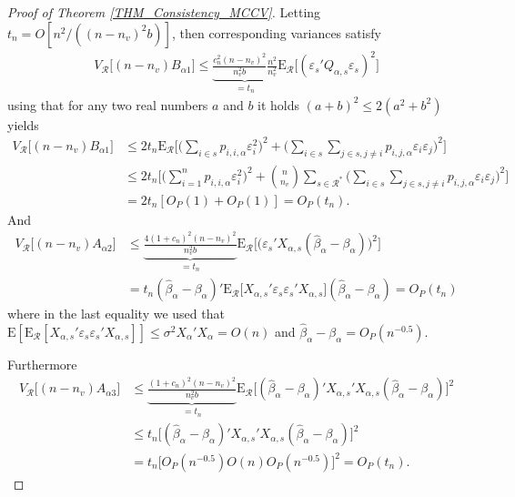 \documentclass[Research_Module_ES.tex]{subfiles}
\begin{document}
\begin{proof}[Proof of Theorem \ref{THM_Consistency_MCCV}]
	Letting $t_n=O[n^2/((n-n_v)^2b)]$, then corresponding variances satisfy
	\begin{align*}
	V_\mathcal{R}\bigl[(n-n_v)B_{\alpha1}\bigr]\le \underbrace{\frac{c_n^2(n-n_v)^2}{n_v^2b}\frac{n^2}{n_v^2}}_{=t_n} \mathrm{E}_\mathcal{R}\biggl[ (\varepsilon_s'Q_{\alpha,s}\varepsilon_s)^2\biggr]
	\end{align*}
	using that for any two real numbers $a$ and $b$ it holds $(a+b)^2\le 2(a^2+b^2)$ yields
	\begin{align*}
	V_\mathcal{R}\bigl[(n-n_v)B_{\alpha1}\bigr]
	&\le 2t_n\mathrm{E}_\mathcal{R}\biggl[\biggl(\sum_{i\in s} p_{i,i,\alpha}\varepsilon_i^2\biggr)^2 + \biggl(\sum_{i\in s}\sum_{j\in s,j\neq i} p_{i,j,\alpha}\varepsilon_i\varepsilon_j\biggr)^2\biggr]\\
	&\le 2t_n \biggl[\biggl(\sum_{i=1}^n p_{i,i,\alpha}\varepsilon_i^2\biggr)^2 + \binom{n}{n_v}\sum_{s\in \mathcal{R}^\ast}\biggl(\sum_{i\in s}\sum_{j\in s,j\neq i} p_{i,j,\alpha}\varepsilon_i\varepsilon_j\biggr)^2\biggr]\\
	&= 2t_n [O_P(1)+O_P(1)]=O_P(t_n).
	\end{align*}
	And 
	\begin{align*}
	V_\mathcal{R}\bigl[(n-n_v)A_{\alpha2}\bigr]
	&\le \underbrace{\frac{4(1+c_n)^2(n-n_v)^2}{n_v^2b}}_{=t_n}\mathrm{E}_\mathcal{R}\bigl[ \bigl(\varepsilon_s'X_{\alpha,s}(\hat{\beta}_\alpha-\beta_\alpha)\bigr)^2\bigr]\\
	&= t_n (\hat{\beta}_\alpha-\beta_\alpha)'\mathrm{E}_\mathcal{R}\bigl[X_{\alpha,s}'\varepsilon_s \varepsilon_s'X_{\alpha,s}\bigr](\hat{\beta}_\alpha-\beta_\alpha) = O_P(t_n)
	\end{align*}
	where in the last equality we used that $\mathrm{E}[\mathrm{E}_\mathcal{R}[X_{\alpha,s}'\varepsilon_s \varepsilon_s'X_{\alpha,s}]]\le \sigma^2 X_\alpha'X_\alpha=O(n)$ and $\hat{\beta}_\alpha-\beta_\alpha=O_P(n^{-0.5})$.\
	
	Furthermore
	\begin{align*}
	V_\mathcal{R}\bigl[(n-n_v)A_{\alpha3}\bigr]
	&\le \underbrace{\frac{(1+c_n)^2(n-n_v)^2}{n_v^2b}}_{=t_n}\mathrm{E}_\mathcal{R}\bigl[(\hat{\beta}_\alpha-\beta_\alpha)'X_{\alpha,s}'X_{\alpha,s}(\hat{\beta}_\alpha-\beta_\alpha)\bigr]^2\\
	&\le t_n \bigl[(\hat{\beta}_\alpha-\beta_\alpha)'X_{\alpha,s}'X_{\alpha,s}(\hat{\beta}_\alpha-\beta_\alpha)\bigr]^2\\
	&= t_n \bigl[O_P(n^{-0.5})O(n)O_P(n^{-0.5})\bigr]^2=O_P(t_n).
	\end{align*}
	

\end{proof}
\end{document}
